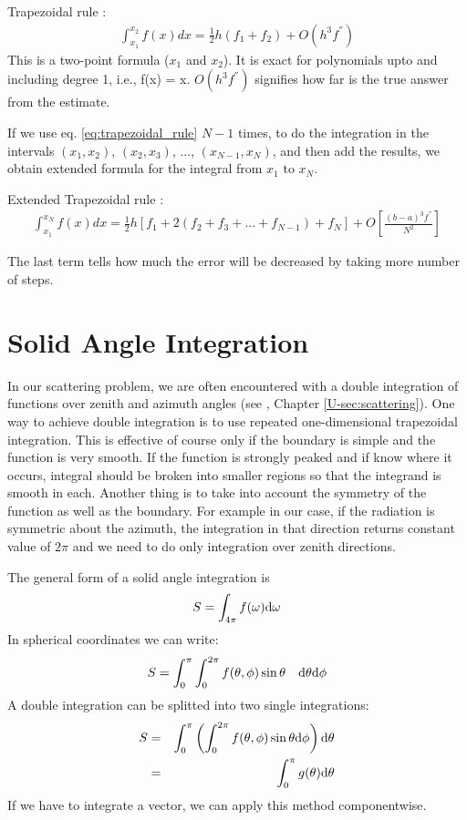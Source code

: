 Trapezoidal rule : 
\begin{eqnarray}
\label{eq:trapezoidal_rule}
{\int_{x_1}^{x_2} f(x)dx}  = \frac{1}{2} h (f_1 + f_2) + O(h^3 f^{''})
\end{eqnarray}
This is a two-point formula ($x_1$ and $x_2$).  It is exact for
polynomials upto and including degree 1, i.e., f(x) = x. $O(h^3
f^{''})$ signifies how far is the true answer from the estimate. 

If we use eq. \ref{eq:trapezoidal_rule} $N - 1$ times, to do the
integration in the intervals $(x_1, x_2)$,  $(x_2, x_3)$, ...,
$(x_{N-1}, x_N)$, and then add the results, we obtain extended formula
for the integral from $x_1$ to $x_N$.

Extended Trapezoidal rule :
\begin{eqnarray}
\label{eq:ext_trapezoidal_rule}
{\int_{x_1}^{x_N} f(x)dx}  = \frac{1}{2} h \left [f_1 + 2(f_2 + f_3 +
... +f_{N-1})+f_N \right] + O\left [ \frac {(b-a)^3 f^{''}}{N^2} \right]
\end{eqnarray}

The last term tells how much the error will be decreased by taking
more number of steps. 

\section{Solid Angle Integration}
\label{sec:integration:solid_angle}
In our scattering problem, we are often encountered with a double integration
of functions over zenith and azimuth angles (see \user, Chapter
\ref{U-sec:scattering}).  One way to achieve
double integration is to use repeated
one-dimensional trapezoidal integration.  This is effective of course
only if the boundary is simple and the function is very smooth.  If
the function is strongly peaked and if know where it occurs, integral
should be broken into smaller regions so that the 
integrand is smooth in each.  Another thing is to take into account
the symmetry of the function as well as the boundary. For example in
our case, if the radiation is symmetric about the azimuth, the
integration in that direction returns constant value of $2 \pi$ and we
need to do only integration over zenith directions.  

The general form of a solid angle integration is
\begin{equation}
  \label{eq:solid_int}
S = \int_{4\pi} f(\omega) \mathrm{d}\omega
\end{equation}
In spherical coordinates we can write:
\begin{equation}
  \label{eq:sol_int_sph}
 S = \int_0^\pi \int_0^{2\pi} f(\theta,\phi) \sin\theta \quad\mathrm{d}\theta\mathrm{d}\phi
\end{equation}
A double integration can be splitted into two single integrations:
\begin{eqnarray}
 S &=& \int_0^\pi \left(\int_0^{2\pi}  f(\theta,\phi) \sin\theta \mathrm{d}\phi \right) \mathrm{d}\theta \\
 &=& \int_0^\pi g(\theta) \mathrm{d}\theta
\end{eqnarray}
If we have to integrate a vector, we can apply this method componentwise.

